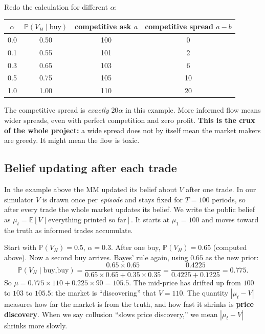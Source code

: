 \documentclass[11pt]{article}
\newcommand{\E}{\mathbb{E}}
\newcommand{\Prob}{\mathbb{P}}
\begin{document}
\begin{example}
Redo the calculation for different $\alpha$:
\begin{center}
\begin{tabular}{cccc}
\toprule
$\alpha$ & $\Prob(V_H\mid\text{buy})$ & competitive ask $a$ & competitive spread $a-b$\\
\midrule
0.0 & 0.50 & 100 & 0\\
0.1 & 0.55 & 101 & 2\\
0.3 & 0.65 & 103 & 6\\
0.5 & 0.75 & 105 & 10\\
1.0 & 1.00 & 110 & 20\\
\bottomrule
\end{tabular}
\end{center}
The competitive spread is \emph{exactly} $20\alpha$ in this example. More informed flow means wider spreads, even with perfect competition and zero profit. \textbf{This is the crux of the whole project:} a wide spread does not by itself mean the market makers are greedy. It might mean the flow is toxic.
\end{example}

\subsection{Belief updating after each trade}
In the example above the MM updated its belief about $V$ after one trade. In our simulator $V$ is drawn once per \emph{episode} and stays fixed for $T=100$ periods, so after every trade the whole market updates its belief. We write the public belief as $\mu_t=\E[V\mid\text{everything printed so far}]$. It starts at $\mu_1=100$ and moves toward the truth as informed trades accumulate.

\begin{example}
Start with $\Prob(V_H)=0.5$, $\alpha=0.3$. After one buy, $\Prob(V_H)=0.65$ (computed above). Now a second buy arrives. Bayes' rule again, using $0.65$ as the new prior:
\[
\Prob(V_H\mid\text{buy,buy})=\frac{0.65\times0.65}{0.65\times0.65+0.35\times0.35}=\frac{0.4225}{0.4225+0.1225}=0.775.
\]
So $\mu=0.775\times110+0.225\times90=105.5$. The mid-price has drifted up from $100$ to $103$ to $105.5$: the market is ``discovering'' that $V=110$. The quantity $|\mu_t-V|$ measures how far the market is from the truth, and how fast it shrinks is \textbf{price discovery}. When we say collusion ``slows price discovery,'' we mean $|\mu_t-V|$ shrinks more slowly.
\end{example}
\end{document}

